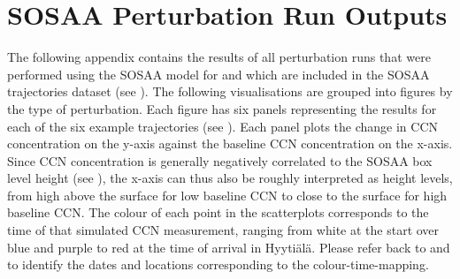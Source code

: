 \chapter{SOSAA Perturbation Run Outputs} \label{app:sosaa-perturbation-outputs}

\captionsetup[figure]{list=no}

The following appendix contains the results of all perturbation runs that were performed using the SOSAA model for  and which are included in the SOSAA trajectories dataset (see ). The following visualisations are grouped into figures by the type of perturbation. Each figure has six panels representing the results for each of the six example trajectories (see ). Each panel plots the change in CCN concentration on the y-axis against the baseline CCN concentration on the x-axis. Since CCN concentration is generally negatively correlated to the SOSAA box level height (see ), the x-axis can thus also be roughly interpreted as height levels, from high above the surface for low baseline CCN to close to the surface for high baseline CCN. The colour of each point in the scatterplots corresponds to the time of that simulated CCN measurement, ranging from white
at the start over blue and purple to red at the time of arrival in Hyyti\"al\"a. Please refer back to  and  to identify the dates and locations corresponding to the colour-time-mapping.

